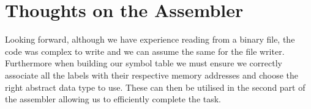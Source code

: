 \documentclass [10pt] {article}
\begin{document}
\section*{Thoughts on the Assembler}
Looking forward, although we have experience reading from a binary file, the code was complex to write and we can assume the same for the file writer. Furthermore when building our symbol table we must ensure we correctly associate all the labels with their respective memory addresses and choose the right abstract data type to use. These can then be utilised in the second part of the assembler allowing us to efficiently complete the task. 
\end{document}
